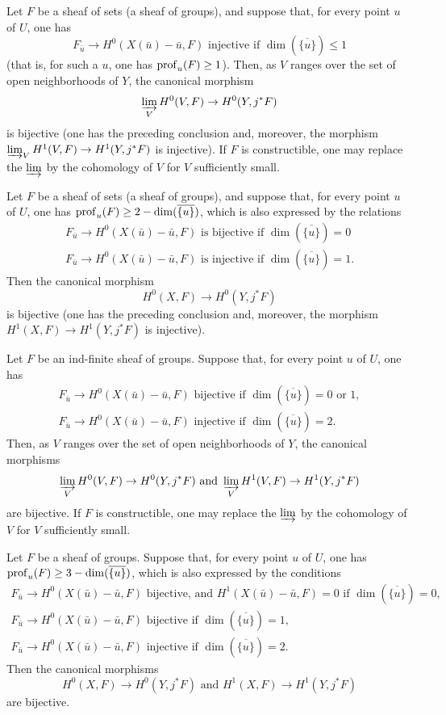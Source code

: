 \begin{enumeratea}
\item
Let $F$ be a sheaf of sets (\resp a sheaf of groups), and suppose that, for every point $u$ of $U$, one has
$$F_{\bar{u}} \to H^0(X(\bar{u})-\bar{u}, F)\text{ injective if } \dim(\overline{\{u\}}) \leq 1$$
(that is, for such a $u$, one has $\operatorname{prof}_u(F) \geq 1$). Then, as $V$ ranges over the set of open neighborhoods of $Y$, the canonical morphism\pageoriginale
$$
\varinjlim_V H^0(V, F) \to H^0(Y, j^*F)
$$
is bijective (\resp one has the preceding conclusion and, moreover, the morphism $\varinjlim_V H^1(V, F) \to H^1(Y, j^* F)$ is injective). If $F$ is constructible, one may replace the $\varinjlim$ by the cohomology of $V$ for $V$ \og sufficiently small\fg.
\item
Let $F$ be a sheaf of sets (\resp a sheaf of groups), and suppose that, for every point $u$ of $U$, one has $\operatorname{prof}_u(F) \geq 2 -\dim(\overline{\{u\}})$, which is also expressed by the relations
\begin{gather*}
F_{\bar{u}}\to H^0(X(\bar{u})-\bar{u}, F)\text{ is bijective if } \dim(\overline{\{u\}})=0\\
F_{\bar{u}}\to H^0(X(\bar{u})-\bar{u}, F)\text{ is injective if } \dim(\overline{\{u\}})=1.
\end{gather*}
Then the canonical morphism
$$H^0(X, F) \to H^0(Y, j^*F)$$
is bijective (\resp one has the preceding conclusion and, moreover, the morphism $H^1(X, F) \to H^1(Y, j^*F)$ is injective).
\item
Let $F$ be an ind-finite sheaf of groups. Suppose that, for every point $u$ of $U$, one has
\begin{gather*}
F_{\bar{u}}\to H^0(X(\bar{u})-\bar{u}, F)\text{ bijective if } \dim(\overline{\{u\}})=0\text{ or }1,\\
F_{\bar{u}}\to H^0(X(\bar{u})-\bar{u}, F)\text{ injective if } \dim(\overline{\{u\}})=2.
\end{gather*}
Then\pageoriginale, as $V$ ranges over the set of open neighborhoods of $Y$, the canonical morphisms
$$
\varinjlim_V H^0(V, F) \to H^0(Y, j^*F) \text{ and } \varinjlim_V H^1(V, F) \to H^1(Y, j^*F)
$$
are bijective. If $F$ is constructible, one may replace the $\varinjlim$ by the cohomology of~$V$ for $V$ sufficiently small.
\item
Let $F$ be a sheaf of groups. Suppose that, for every point $u$ of $U$, one has $\operatorname{prof}_u(F) \geq 3-\dim(\overline{\{u\}})$, which is also expressed by the conditions
\begin{gather*}
F_{\bar{u}}\to H^0(X(\bar{u})-\bar{u}, F)\text{ bijective, and } H^1(X(\bar{u})-\bar{u}, F)=0 \text{ if } \dim(\overline{\{u\}})=0,\\
F_{\bar{u}}\to H^0(X(\bar{u})-\bar{u}, F)\text{ bijective if } \dim(\overline{\{u\}})=1,\\
F_{\bar{u}}\to H^0(X(\bar{u})-\bar{u}, F)\text{ injective if } \dim(\overline{\{u\}})=2.
\end{gather*}
Then the canonical morphisms
$$H^0(X, F) \to H^0(Y, j^*F)\text{ and } H^1(X, F) \to H^1(Y, j^*F)$$
are bijective.
\end{enumeratea}


